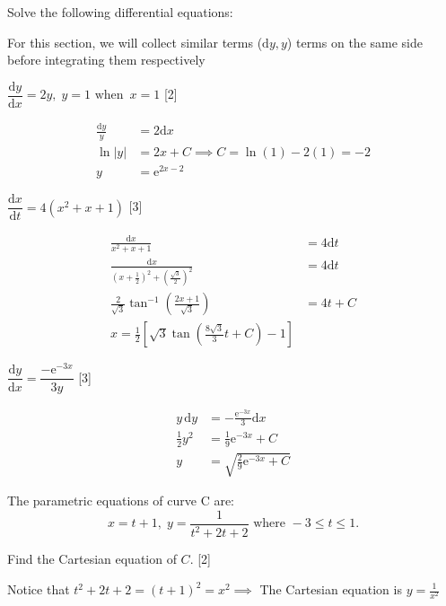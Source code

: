 \documentclass[12pt, a4 paper]{article}
\begin{document}
\begin{outline}[enumerate]
 \1 Solve the following differential equations: %
 \begin{answer}
  For this section, we will collect similar terms (\(\mathrm{d}y, y\)) terms on the same side before integrating them respectively
 \end{answer}

 \2 \(\dfrac{{{\mathrm{d}}y}}{{{\mathrm{d}}x}} = 2y,\;y = 1{\textrm{ when }}\,x = 1\) \hfill[2]
 \begin{answer}
  \begin{align*}
   \frac{\mathrm{d}y}{y} & = 2\mathrm{d}x                     \\
   \ln|y|                & = 2x+C \implies C=\ln(1)-2(1) = -2 \\
   y                     & = \mathrm{e}^{2x-2}
  \end{align*}
 \end{answer}

 \2 \(\dfrac{{{\mathrm{d}}x}}{{{\mathrm{d}}t}} = 4({x^2} + x + 1)\) \hfill[3]
 \begin{answer}
  \begin{align*}
   \frac{\mathrm{d}x}{x^2+x+1}                                & = 4\mathrm{d}t \\
   \frac{\mathrm{d}x}{{(x+\frac{1}{2})}^2+{(\frac{\sqrt3}{2})}^2} & = 4\mathrm{d}t \\
   \frac{2}{\sqrt3}\tan^{-1}\left(\frac{2x+1}{\sqrt3}\right)  & = 4t + C       \\
   x = \frac{1}{2}\left[\sqrt3\tan\left(\frac{8\sqrt3}{3}t + C\right)-1\right]
  \end{align*}
 \end{answer}

 \2 \(\dfrac{{{\mathrm{d}}y}}{{{\mathrm{d}}x}} = \dfrac{{ - {\mathrm{e}^{ - 3x}}}}{{3y}}\) \hfill[3]
 \begin{answer}
  \begin{align*}
   y\,\mathrm{d}y & = -\frac{\mathrm{e}^{-3x}}{3} \mathrm{d}x \\
   \frac{1}{2}y^2 & = \frac{1}{9}\mathrm{e}^{-3x} + C         \\
   y              & = \sqrt{\frac{2}{9}\mathrm{e}^{-3x} + C}
  \end{align*}
 \end{answer}

 \1 The parametric equations of curve C are: \[x = t + 1,\;y = \frac{1}{{{t^2} + 2t + 2}}{\textrm{ where }} - 3 \leq t \leq 1.\] %

 \2 Find the Cartesian equation of \(C\). \hfill[2]
 \begin{answer}
  Notice that \(t^2+2t+2 = {(t+1)}^2 = x^2\implies \) The Cartesian equation is \(y=\frac{1}{x^2}\)
 \end{answer}


\end{outline}
\end{document}
